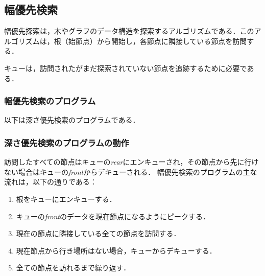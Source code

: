 \documentclass[a4j, titlepage]{jarticle}
\begin{document}
    \subsection{幅優先検索}
    幅優先探索は，木やグラフのデータ構造を探索するアルゴリズムである．このアルゴリズムは，根（始節点）から開始し，各節点に隣接している節点を訪問する．

    キューは，訪問されたがまだ探索されていない節点を追跡するために必要である．

        \subsubsection{幅優先検索のプログラム}
        以下は深さ優先検索のプログラムである．
         
        
        \subsubsection{深さ優先検索のプログラムの動作}
        訪問したすべての節点はキューの\textit{rear}にエンキューされ，その節点から先に行けない場合はキューの\textit{front}からデキューされる．
        幅優先検索のプログラムの主な流れは，以下の通りである：
        \begin{screen}
            \begin{enumerate}
                \item 根をキューにエンキューする．
                \item キューの\textit{front}のデータを現在節点になるようにピークする．
                \item 現在の節点に隣接している全ての節点を訪問する．
                \item 現在節点から行き場所はない場合，キューからデキューする．
                \item 全ての節点を訪れるまで繰り返す．
            \end{enumerate}
        \end{screen}
        
\end{document}
